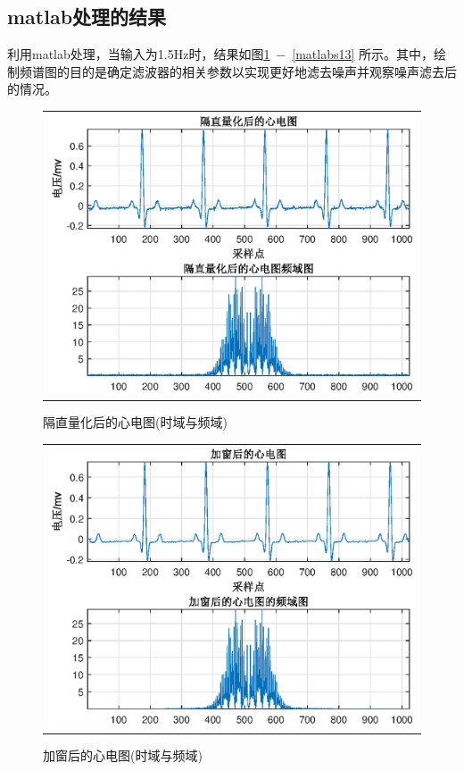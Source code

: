 \documentclass[12pt]{article}
\begin{document}
\subsection{matlab处理的结果}
利用matlab处理，当输入为1.5Hz时，结果如图\ref{matlabs11}\ $-$\ \ref{matlabs13}
所示。其中，绘制频谱图的目的是确定滤波器的相关参数以实现更好地滤去噪声并观察噪声滤去后的情况。
\begin{figure}[htbp]
  \centering
  \begin{tabular}{c}
  \includegraphics[width=.8\textwidth]{g1}
  \end{tabular}
  \caption{隔直量化后的心电图(时域与频域)}\label{matlabs11}
\end{figure}
\begin{figure}[htbp]
  \centering
  \begin{tabular}{c}
  \includegraphics[width=.8\textwidth]{j1}
  \end{tabular}
  \caption{加窗后的心电图(时域与频域)}\label{matlabs12}
\end{figure}
\end{document}
